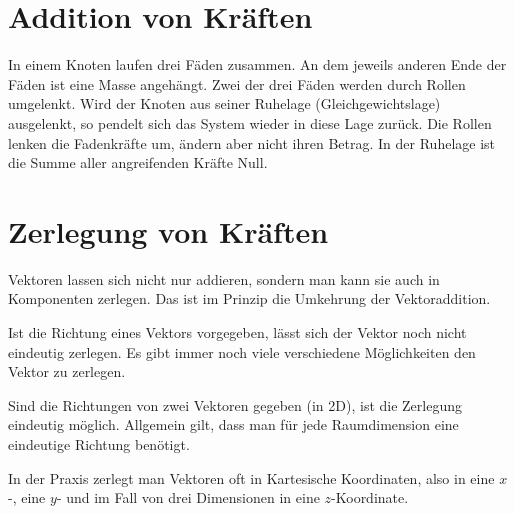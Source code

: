 
\section*{Addition von Kräften}

In einem Knoten laufen drei Fäden zusammen. An dem jeweils anderen Ende der Fäden ist eine Masse angehängt.
Zwei der drei Fäden werden durch Rollen umgelenkt.
Wird der Knoten aus seiner Ruhelage (Gleichgewichtslage) ausgelenkt, so pendelt sich das System wieder in diese Lage zurück.
Die Rollen lenken die Fadenkräfte um, ändern aber nicht ihren Betrag.
In der Ruhelage ist die Summe aller angreifenden Kräfte Null.



\newpage
\section*{Zerlegung von Kräften}

Vektoren lassen sich nicht nur addieren, sondern man kann sie auch in Komponenten zerlegen. Das ist im Prinzip die Umkehrung
der Vektoraddition.



Ist die Richtung eines Vektors vorgegeben, lässt sich der Vektor noch nicht eindeutig zerlegen. Es gibt immer
noch viele verschiedene Möglichkeiten den Vektor zu zerlegen.

\newpage


Sind die Richtungen von zwei Vektoren gegeben (in 2D), ist die Zerlegung eindeutig möglich. Allgemein gilt, dass man
für jede Raumdimension eine eindeutige Richtung benötigt.



In der Praxis zerlegt man Vektoren oft in Kartesische Koordinaten, also in eine $x$-, eine $y$- und im Fall von drei Dimensionen in eine $z$-Koordinate.


\newpage


\newpage
{}


